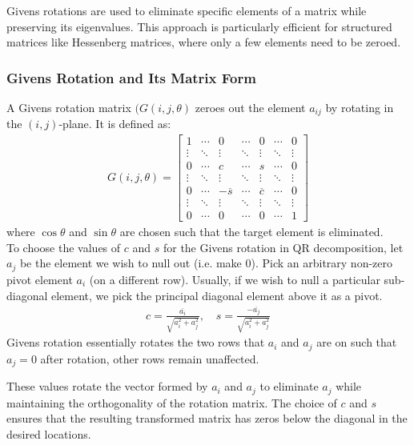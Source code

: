 \documentclass[12pt]{article}
\begin{document}
Givens rotations are used to eliminate specific elements of a matrix while preserving its eigenvalues. This approach is particularly efficient for structured matrices like Hessenberg matrices, where only a few elements need to be zeroed.

\subsubsection{Givens Rotation and Its Matrix Form}

A Givens rotation matrix $(G(i,j,\theta)$ zeroes out the element $a_{ij}$ by rotating in the $(i,j)$-plane. It is defined as:
\begin{align*}
G(i, j, \theta) = \begin{bmatrix}
1 & \cdots & 0 & \cdots & 0 & \cdots & 0 \\
\vdots & \ddots & \vdots & \ddots & \vdots & \ddots & \vdots \\
0 & \cdots & c & \cdots & s & \cdots & 0 \\
\vdots & \ddots & \vdots & \ddots & \vdots & \ddots & \vdots \\
0 & \cdots & -\overline{s} & \cdots & \overline{c} & \cdots & 0 \\
\vdots & \ddots & \vdots & \ddots & \vdots & \ddots & \vdots \\
0 & \cdots & 0 & \cdots & 0 & \cdots & 1
\end{bmatrix}
\end{align*}
where $\cos\theta$ and $\sin\theta$ are chosen such that the target element is eliminated.\\
To choose the values of $c$ and $s$ for the Givens rotation in QR decomposition, let $a_j$ be the element we wish to null out (i.e. make 0). Pick an arbitrary non-zero pivot element $a_i$ (on a different row). Usually, if we wish to null a particular sub-diagonal element, we pick the principal diagonal element above it as a pivot.
\begin{align*}
c = \frac{\overline{a_{i}}}{\sqrt{a_{i}^2 + a_{j}^2}}, \quad s = \frac{-\overline{a_{j}}}{\sqrt{a_{i}^2 + a_{j}^2}}
\end{align*}
Givens rotation essentially rotates the two rows that $a_i$ and $a_j$ are on such that $a_j = 0$ after rotation, other rows remain unaffected. 

These values rotate the vector formed by $a_{i}$ and $a_{j}$ to eliminate $a_{j}$ while maintaining the orthogonality of the rotation matrix. The choice of $c$ and $s$ ensures that the resulting transformed matrix has zeros below the diagonal in the desired locations.
\end{document}
